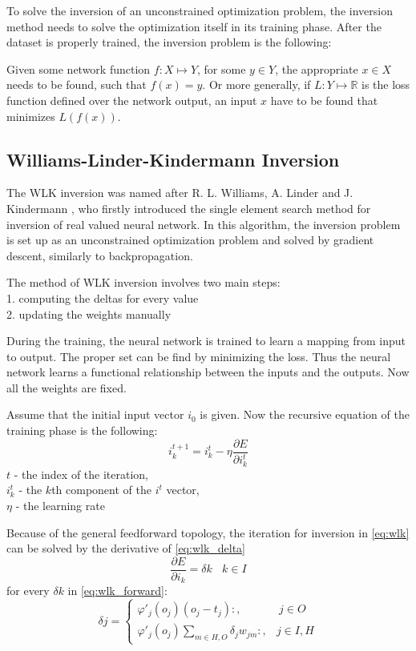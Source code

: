 To solve the inversion of an unconstrained optimization problem, the inversion method needs to solve the optimization itself in its training phase. After the dataset is properly trained, the inversion problem is the following:\medskip

Given some network function $f : X \mapsto Y$, for some $y \in Y$, the appropriate $x \in X$ needs to be found, such that $f(x) = y$. Or more generally, if $L : Y \mapsto \mathbb{R}$ is the loss function defined over the network output, an input $x$ have to be found that minimizes $L(f(x))$. 


\subsection{Williams-Linder-Kindermann Inversion}

\label{para:wlk-inv}The WLK inversion was named after R. L. Williams, A. Linder and J. Kindermann \cite{KINDERMANN1990277}, who firstly introduced the single element search method for inversion of real valued neural network. In this algorithm, the inversion problem is set up as an unconstrained optimization problem and solved by gradient descent, similarly to backpropagation. \medskip

\noindent The method of WLK inversion involves two main steps: \\
1. computing the deltas for every value \\
2. updating the weights manually \bigskip

During the training, the neural network is trained to learn a mapping from input to output. The proper set can be find by minimizing the loss. Thus the neural network learns a functional relationship between the inputs and the outputs. Now all the weights are fixed. \medskip

Assume that the initial input vector $i_0$ is given. Now the recursive equation of the training phase is the following: 
\begin{equation} i_k^{t+1} = i_k^t - \eta \frac{\partial E}{\partial i_k^t} \label{eq:wlk} \end{equation} 
$t$ - the index of the iteration, \\
$i_k^t$ - the $k$th component of the $i^t$ vector, \\
$\eta$ - the learning rate \bigskip

Because of the general feedforward topology, the iteration for inversion in \eqref{eq:wlk} can be solved by the derivative of \eqref{eq:wlk_delta}
\begin{equation} \frac{\partial E}{\partial i_k} = \delta k ~~~~ k \in I \label{eq:wlk_delta} \end{equation}
for every $\delta k$ in \eqref{eq:wlk_forward}:
\begin{equation} \delta j = \begin{cases} \varphi'_j(o_j)(o_j-t_j):, & ~ j \in O \\ 
\varphi'_j(o_j)\sum_{m\in H,O}\delta_j w_{jm}:, & j \in I, H \end{cases} \label{eq:wlk_forward} \end{equation}

